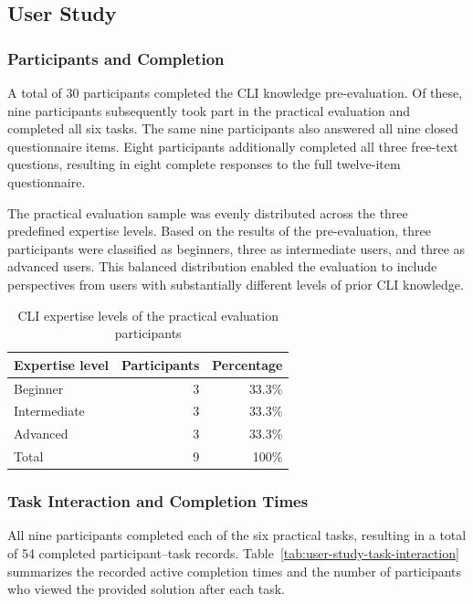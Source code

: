 \subsection{User Study}

\subsubsection{Participants and Completion}

A total of 30 participants completed the CLI knowledge pre-evaluation. Of these, nine participants subsequently took part in the practical evaluation and completed all six tasks. The same nine participants also answered all nine closed questionnaire items. Eight participants additionally completed all three free-text questions, resulting in eight complete responses to the full twelve-item questionnaire.

The practical evaluation sample was evenly distributed across the three predefined expertise levels. Based on the results of the pre-evaluation, three participants were classified as beginners, three as intermediate users, and three as advanced users. This balanced distribution enabled the evaluation to include perspectives from users with substantially different levels of prior CLI knowledge.

\FloatBarrier
\begin{table}[htbp]
    \centering
    \caption{CLI expertise levels of the practical evaluation participants}
    \label{tab:user-study-expertise}
    \begin{tabular}{lrr}
        \hline
        \textbf{Expertise level} & \textbf{Participants} & \textbf{Percentage} \\
        \hline
        Beginner     & 3 & 33.3\% \\
        Intermediate & 3 & 33.3\% \\
        Advanced     & 3 & 33.3\% \\
        \hline
        Total        & 9 & 100\% \\
        \hline
    \end{tabular}
\end{table}
\FloatBarrier

\subsubsection{Task Interaction and Completion Times}

All nine participants completed each of the six practical tasks, resulting in a total of 54 completed participant--task records. Table~\ref{tab:user-study-task-interaction} summarizes the recorded active completion times and the number of participants who viewed the provided solution after each task. 

